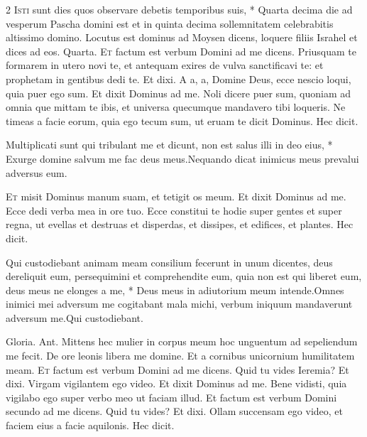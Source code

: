 \begin{multicols*}{2}
\lettrine[lines=2]{\zallmancaps \color{Blue} I}{sti} \hypertarget{isti-sunt-dies}{\label{isti-sunt-dies}} sunt dies quos observare debetis temporibus suis, * Quarta decima die ad vesperum Pascha domini est et in quinta decima sollemnitatem celebrabitis altissimo domino. \V Locutus est dominus ad Moysen dicens, loquere filiis Israhel et dices ad eos. Quarta.
\lettrine[lines=2]{\zallmancaps \color{Red} E}{t} factum est verbum Domini ad me dicens. Priusquam te formarem in utero novi te, et antequam exires de vulva sanctificavi te: et prophetam in gentibus dedi te. Et dixi. A a, a, Domine Deus, ecce nescio loqui, quia puer ego sum. Et dixit Dominus ad me. Noli dicere puer sum, quoniam ad omnia que mittam te ibis, et universa quecumque mandavero tibi loqueris. Ne timeas a facie eorum, quia ego tecum sum, ut eruam te dicit Dominus. Hec dicit.
\begin{responsory}
{Multiplicati sunt qui tribulant me et dicunt, non est salus illi in deo eius, * Exurge domine salvum me fac deus meus.}{Nequando dicat inimicus meus prevalui adversus eum.}
\end{responsory}%
\lettrine[lines=2]{\zallmancaps \color{Blue} E}{t} misit Dominus manum suam, et tetigit os meum. Et dixit Dominus ad me. Ecce dedi verba mea in ore tuo. Ecce constitui te hodie super gentes et super regna, ut evellas et destruas et disperdas, et dissipes, et edifices, et plantes. Hec dicit.
\begin{responsory}
{Qui custodiebant animam meam consilium fecerunt in unum dicentes, deus dereliquit eum, persequimini et comprehendite eum, quia non est qui liberet eum, deus meus ne elonges a me, * Deus meus in adiutorium meum intende.}{Omnes inimici mei adversum me cogitabant mala michi, verbum iniquum mandaverunt adversum me.}Qui custodiebant.
\end{responsory}%
 Gloria. {\color{Red} Ant.} Mittens hec mulier in corpus meum hoc unguentum ad sepeliendum me fecit. \V De ore leonis libera me domine. \R Et a cornibus unicornium humilitatem meam.%
\lettrine[lines=2]{\zallmancaps \color{Red} E}{t} factum est verbum Domini ad me dicens. Quid tu vides Ieremia? Et dixi. Virgam vigilantem ego video. Et dixit Dominus ad me. Bene vidisti, quia vigilabo ego super verbo meo ut faciam illud. Et factum est verbum Domini secundo ad me dicens. Quid tu vides? Et dixi. Ollam succensam ego video, et faciem eius a facie aquilonis. Hec dicit.

\end{multicols*}
